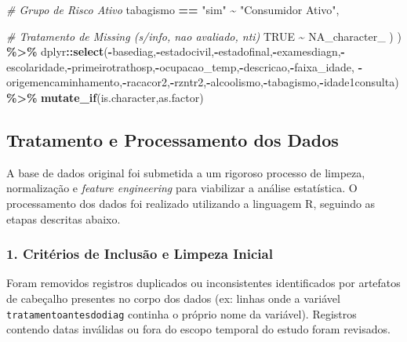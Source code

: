\documentclass[
]{article}
\newenvironment{Shaded}{\begin{snugshade}}{\end{snugshade}}
\newcommand{\CommentTok}[1]{\textcolor[rgb]{0.56,0.35,0.01}{\textit{#1}}}
\newcommand{\ConstantTok}[1]{\textcolor[rgb]{0.56,0.35,0.01}{#1}}
\newcommand{\FunctionTok}[1]{\textcolor[rgb]{0.13,0.29,0.53}{\textbf{#1}}}
\newcommand{\NormalTok}[1]{#1}
\newcommand{\SpecialCharTok}[1]{\textcolor[rgb]{0.81,0.36,0.00}{\textbf{#1}}}
\newcommand{\StringTok}[1]{\textcolor[rgb]{0.31,0.60,0.02}{#1}}
\begin{document}
\begin{Shaded}
\begin{Highlighting}[]
      \CommentTok{\# Grupo de Risco Ativo}
\NormalTok{      tabagismo }\SpecialCharTok{==} \StringTok{"sim"} \SpecialCharTok{\textasciitilde{}} \StringTok{"Consumidor Ativo"}\NormalTok{,}
      
      \CommentTok{\# Tratamento de Missing (s/info, nao avaliado, nti)}
      \ConstantTok{TRUE} \SpecialCharTok{\textasciitilde{}} \ConstantTok{NA\_character\_}
\NormalTok{    )}
\NormalTok{  ) }\SpecialCharTok{\%\textgreater{}\%} 
\NormalTok{  dplyr}\SpecialCharTok{::}\FunctionTok{select}\NormalTok{(}\SpecialCharTok{{-}}\NormalTok{basediag,}\SpecialCharTok{{-}}\NormalTok{estadocivil,}\SpecialCharTok{{-}}\NormalTok{estadofinal,}\SpecialCharTok{{-}}\NormalTok{examesdiagn,}\SpecialCharTok{{-}}\NormalTok{escolaridade,}\SpecialCharTok{{-}}\NormalTok{primeirotrathosp,}\SpecialCharTok{{-}}\NormalTok{ocupacao\_temp,}\SpecialCharTok{{-}}\NormalTok{descricao,}\SpecialCharTok{{-}}\NormalTok{faixa\_idade,}
         \SpecialCharTok{{-}}\NormalTok{origemencaminhamento,}\SpecialCharTok{{-}}\NormalTok{racacor2,}\SpecialCharTok{{-}}\NormalTok{rzntr2,}\SpecialCharTok{{-}}\NormalTok{alcoolismo,}\SpecialCharTok{{-}}\NormalTok{tabagismo,}\SpecialCharTok{{-}}\NormalTok{idade1consulta) }\SpecialCharTok{\%\textgreater{}\%} 
  \FunctionTok{mutate\_if}\NormalTok{(is.character,as.factor)}
\end{Highlighting}
\end{Shaded}

\subsection{Tratamento e Processamento dos
Dados}\label{tratamento-e-processamento-dos-dados}

A base de dados original foi submetida a um rigoroso processo de
limpeza, normalização e \emph{feature engineering} para viabilizar a
análise estatística. O processamento dos dados foi realizado utilizando
a linguagem R, seguindo as etapas descritas abaixo.

\subsubsection{1. Critérios de Inclusão e Limpeza
Inicial}\label{crituxe9rios-de-inclusuxe3o-e-limpeza-inicial}

Foram removidos registros duplicados ou inconsistentes identificados por
artefatos de cabeçalho presentes no corpo dos dados (ex: linhas onde a
variável \texttt{tratamentoantesdodiag} continha o próprio nome da
variável). Registros contendo datas inválidas ou fora do escopo temporal
do estudo foram revisados.
\end{document}
